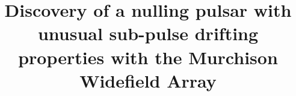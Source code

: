 \documentclass[twocolumn]{aastex631}
\begin{document}
\title{Discovery of a nulling pulsar with unusual sub-pulse
drifting properties with the Murchison Widefield Array}


\end{document}

